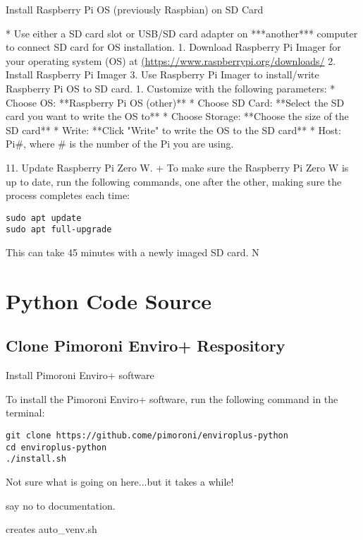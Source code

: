 \documentclass{article}
\begin{document}
Install Raspberry Pi OS (previously Raspbian) on SD Card


* Use either a SD card slot or USB/SD card adapter on ***another*** computer to connect SD card for OS installation.
    1. Download Raspberry Pi Imager for your operating system (OS) at \href{https://www.raspberrypi.org/downloads/}{(https://www.raspberrypi.org/downloads/}
    2. Install Raspberry Pi Imager
    3. Use Raspberry Pi Imager to install/write Raspberry Pi OS to SD card.
        1. Customize with the following parameters: 
            * Choose OS: **Raspberry Pi OS (other)**
            * Choose SD Card: **Select the SD card you want to write the OS to**
            * Choose Storage: **Choose the size of the SD card**
            * Write: **Click "Write" to write the OS to the SD card**
            * Host: Pi\#, where \# is the number of the Pi you are using.

            
  11. Update Raspberry Pi Zero W.
  + To make sure the Raspberry Pi Zero W is up to date, run the following commands, one after the other, making sure the process completes each time:
  

\begin{verbatim}
sudo apt update
sudo apt full-upgrade
\end{verbatim}

This can take 45 minutes with a newly imaged SD card. N



\section{Python Code Source}

\subsection{Clone Pimoroni Enviro+ Respository}

Install Pimoroni Enviro+ software


To install the Pimoroni Enviro+ software, run the following command in the terminal:

\begin{verbatim}
git clone https://github.come/pimoroni/enviroplus-python
cd enviroplus-python
./install.sh
\end{verbatim}


Not sure what is going on here...but it takes a while!

say no to documentation. 

creates auto\_venv.sh
\end{document}
